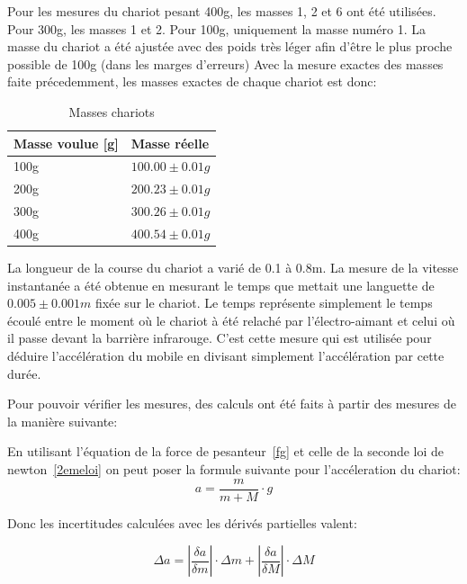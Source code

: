 Pour les mesures du chariot pesant 400g, les masses 1, 2 et 6 ont été utilisées. Pour 300g, les masses 1 et 2. Pour 100g, uniquement la masse numéro 1. La masse du chariot a été ajustée avec des poids très léger afin d'être le plus proche possible de 100g (dans les marges d'erreurs) Avec la mesure exactes des masses faite précedemment, les masses exactes de chaque chariot est donc:

\begin{table}[ht]
    \centering
    \caption[Masses chariots]{Masses chariots}
    \begin{tabular}{|l|l|}
	\hline
	Masse voulue [g] & Masse réelle \\
	\hline
	100g & $100.00\pm 0.01g$ \\
	200g & $200.23\pm 0.01g$ \\
	300g & $300.26\pm 0.01g$ \\
	400g & $400.54\pm 0.01g$ \\
	\hline
    \end{tabular}
\end{table}

La longueur de la course du chariot a varié de 0.1 à 0.8m. La mesure de la vitesse instantanée a été obtenue en mesurant le temps que mettait une languette de $0.005 \pm 0.001m$ fixée sur le chariot.
Le temps représente simplement le temps écoulé entre le moment où le chariot à été relaché par l'électro-aimant et celui où il passe devant la barrière infrarouge. C'est cette mesure qui est utilisée pour déduire l'accélération du mobile en divisant simplement l'accélération par cette durée.

Pour pouvoir vérifier les mesures, des calculs ont été faits à partir des mesures de la manière suivante:

En utilisant l'équation de la force de pesanteur~\eqref{fg} et celle de la seconde loi de newton~\eqref{2emeloi} on peut poser la formule suivante pour l'accéleration du chariot:
\begin{equation}
    a = \frac{m}{m + M} \cdot g
\end{equation}

Donc les incertitudes calculées avec les dérivés partielles valent:

\begin{equation}
    \Delta a = |\frac{\delta a}{\delta m}| \cdot \Delta m + |\frac{\delta a}{\delta M}| \cdot \Delta M
\end{equation}

